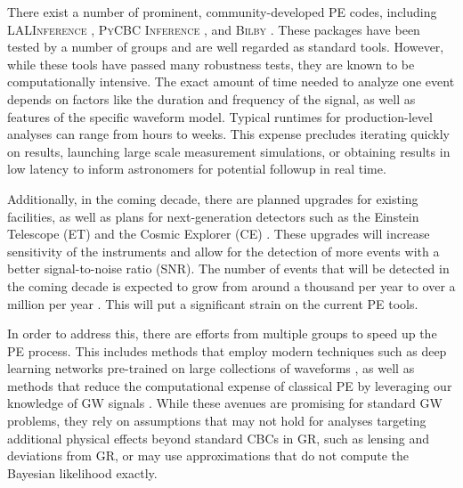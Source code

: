 \documentclass[twocolumn]{aastex631}
\newcommand{\mi}[1]{\textsf{\color{teal}[\textbf{MI:} #1]}}
\begin{document}
There exist a number of prominent, community-developed PE codes, including
\textsc{LALInference} \cite{Veitch:2014wba}, \textsc{PyCBC Inference}
\cite{Biwer:2018osg}, and \textsc{Bilby} \cite{Ashton:2018jfp}.  These packages
have been tested by a number of groups and are well regarded as standard tools.
However, while these tools have passed many robustness tests, they are known to
be computationally intensive. The exact amount of time needed to analyze one
event depends on factors like the duration and frequency of the signal, as well
as features of the specific waveform model. Typical runtimes for
production-level analyses can range from hours to weeks. This expense precludes
iterating quickly on results, launching large scale measurement simulations, or
obtaining results in low latency to inform astronomers for potential followup
in real time.

Additionally, in the coming decade, there are planned upgrades for existing
facilities, as well as plans for next-generation detectors such as the Einstein
Telescope (ET) \cite{Punturo:2010zz} and the Cosmic Explorer (CE)
\cite{LIGOScientific:2016wof}. These upgrades will increase sensitivity of
the instruments and allow for the detection of more events with a better
signal-to-noise ratio (SNR). The number of events that will be detected in the
coming decade is expected to grow from around a thousand per year to over a
million per year \cite{Baibhav:2019gxm}. This will put a significant strain on
the current PE tools.

In order to address this, there are efforts from multiple groups to speed up
the PE process. This includes methods that employ modern techniques such as
deep learning networks pre-trained on large collections of waveforms
\cite{Dax:2021tsq,Dax:2022pxd}, as well as methods that reduce the
computational expense of classical PE by leveraging our knowledge of GW signals
\cite{Islam:2022afg,Roulet:2022kot}. While these avenues are promising for
standard GW problems, they rely on assumptions that may not hold for analyses
targeting additional physical effects beyond standard CBCs in GR, such as
lensing and deviations from GR, or may use approximations that do not compute
the Bayesian likelihood exactly.

\end{document}
